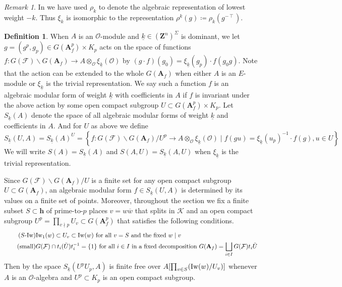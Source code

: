 \documentclass[leqno]{amsart}
\theoremstyle{definition}
\newtheorem{defn}[thm]{Definition}
\theoremstyle{remark}
\newtheorem{rem}[thm]{Remark}
\newcommand{\oo}{\mathcal{O}}
\newcommand{\Z}{{\mathbf{Z}}}
\newcommand{\A}{\mathbf A}
\newcommand{\finite}{\mathbf{h}}
\newcommand{\F}{{\mathcal{F}}} %
\newcommand{\K}{{\mathcal{K}}} %
\newcommand{\bw}{\overline{w}}
\newcommand{\wt}[1]{\underline{ #1 }}
\newcommand{\Iw}{\textnormal{Iw}} %
\begin{document}
\begin{rem}
    In \cite{lee} we have used  $\rho_k$ to denote
	the algebraic representation of lowest weight  $-k$.
	Thus $\xi_k$ is isomorphic to the representation 
	$\rho^k(g)\coloneqq \rho_k(g^{-\intercal})$.
\end{rem}




\begin{defn}\label{def:algform}
When $A$ is an $\oo$-module and  
$\wt{k}\in (\Z^n)^{\Sigma}$ is dominant,
we let $g=(g^p,g_p)\in G(\A_f^p)\times K_p$ acts on 
the space of functions
$f\colon G(\F)\backslash G(\A_f)\to A\otimes_{\oo}\xi_{\wt{k}}(\oo)$
by $(g\cdot f)(g_0)=\xi_{\wt{k}}(g_p)\cdot f(g_0g)$.
Note that the action can be extended to the whole $G(\A_f)$
when either $A$ is an $E$-module or $\xi_{\wt{k}}$
is the trivial representation.
We say such a function $f$ is an algebraic modular form of
weight $\wt{k}$ with coefficients in $A$
if $f$ is invariant under the above action 
by some open compact subgroup
$U\subset G(\A_f^p)\times K_p$.
Let $S_{\wt{k}}(A)$
denote the space of all algebraic modular forms
of weight $\wt{k}$ and coefficients in $A$.
And for $U$ as above we define
\begin{equation}
S_{\wt{k}}(U,A)=
S_{\wt{k}}(A)^U=
\left\{ f: G(\F)\backslash G(\A_f)/U^p 
\rightarrow A\otimes_{\oo}\xi_{\wt{k}}(\oo)
\mid f(gu)=\xi_{\wt{k}}(u_p)^{-1}\cdot f(g), u\in U\right\} 
\end{equation}
We will write $S(A)=S_{\wt{k}}(A)$ and
$S(A,U)=S_{\wt{k}}(A,U)$
when $\xi_{\wt{k}}$ is the trivial representation.
\end{defn}


Since $G(\F)\backslash G(\A_f)/U$ is a finite set
for any open compact subgroup $U\subset G(\A_f)$,
an algebraic modular form $f\in S_{\wt{k}}(U,A)$ 
is determined by its values on a finite set of points.
Moreover, throughout the section
we fix a finite subset $S\subset \finite$
of prime-to-$p$ places $v=w\bw$ that splits in $\K$
and an open compact subgroup $U^p=\prod_{v\nmid p}U_v\subset G(\A_f^p)$ 
that satisfies the following conditions.
\begin{align}
    \label{cond:s-ram}\tag{$S$-$\Iw$}
    &\Iw_1(w)\subset U_v \subset \Iw(w) \text{ for all } 
    v=S \text{ and the fixed }w\mid v\\
    \label{cond:small}\tag{\text{small}}
	&G(\F)\cap t_i(\tilde{U})t_i^{-1}=\{1\} \text{ for all } 
    i\in I \text{ in a fixed decomposition }
    G(\A_f)=\bigsqcup_{i\in I} G(\F)t_i \tilde{U}
\end{align}
Then by \cite[Lem 2.6]{ger} the space $S_{\wt{k}}(U^pU_p,A)$
is finite free over 
$A[\prod_{v\in S}(\Iw(w)/U_v)]$
whenever $A$ is an $\oo$-algebra
and $U^p\subset K_p$ is an open compact subgroup.
\end{document}

